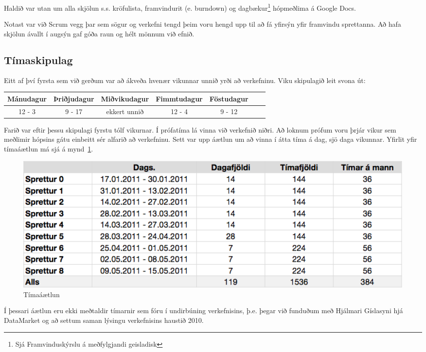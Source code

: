 \documentclass{article}
\begin{document}
Haldið var utan um alla skjölun s.s. kröfulista, framvindurit (e. burndown) og dagbækur\footnote{Sjá Framvinduskýrslu á meðfylgjandi geisladisk}
 hópmeðlima á Google Docs. 

Notast var við Scrum vegg þar sem sögur og verkefni tengd þeim voru hengd upp til að fá yfirsýn 
yfir framvindu sprettanna. Að hafa skjölun ávallt í augsýn gaf góða raun og hélt mönnum við efnið.

\subsection{Tímaskipulag}
Eitt af því fyrsta sem við gerðum var að ákveða hvenær 
vikunnar unnið yrði að verkefninu.
Viku skipulagið leit svona út:

\vspace{5 mm}
\begin{tabular}{| c | c | c | c | c | c | c |}
\hline 
Mánudagur & Þriðjudagur & Miðvikudagur & Fimmtudagur & Föstudagur \\
\hline
12 - 3 & 9 - 17 & ekkert unnið & 12 - 4 & 9 - 12 \\ 
\hline
\end{tabular}
\vspace{5 mm}

Farið var eftir þessu skipulagi fyrstu tólf vikurnar. 
Í prófatíma lá vinna við verkefnið niðri. 
Að loknum prófum voru þrjár vikur sem meðlimir hópsins gátu einbeitt sér alfarið
að verkefninu. Sett var upp áætlun um að vinna í átta tíma á dag, sjö daga
vikunnar. Yfirlit yfir tímaáætlun má sjá á mynd~\ref{fig:timeplan}.

\begin{figure}[H]
  \centering
  \includegraphics[width=1\textwidth]{sprettir_timar.png} 
  \caption{Tímaáætlun} 
  \label{fig:timeplan}
\end{figure}

Í þessari áætlun eru ekki meðtaldir tímarnir sem fóru í undirbúning verkefnisins, þ.e.
þegar við funduðum með Hjálmari Gíslasyni hjá DataMarket og að settum saman
lýsingu verkefnisins haustið 2010.
\end{document}
